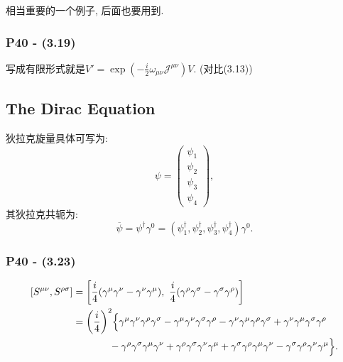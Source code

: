 \documentclass[cn,hazy,blue,11pt,device=normal,chinesefont=founder]{elegantnote}
\begin{document}
相当重要的一个例子, 后面也要用到. 

\subsubsection{P40 - (3.19)}

写成有限形式就是$V' = \exp{(-\frac{i}{2}\omega_{\mu\nu}\mathcal{J}^{\mu\nu})}V$. (对比(3.13))

\subsection{The Dirac Equation}

\begin{note}
  狄拉克旋量具体可写为:  
  \begin{equation}
    \psi = \left( \begin{array}{c} \psi_1 \\ \psi_2 \\ \psi_3 \\ \psi_4 \end{array} \right), 
  \end{equation}
  其狄拉克共轭为: 
  \begin{equation}
    \overline{\psi} = \psi^\dagger \gamma^0 = (\psi^\dagger_1, \psi^\dagger_2, \psi^\dagger_3, \psi^\dagger_4)\gamma^0. 
  \end{equation}
\end{note}

\subsubsection{P40 - (3.23)}

\begin{equation}
  \begin{aligned}
    \relax
    [S^{\mu\nu}, S^{\rho\sigma}] &= \biggl[\frac{i}{4}(\gamma^\mu \gamma^\nu - \gamma^\nu \gamma^\mu), \ \frac{i}{4}(\gamma^\rho \gamma^\sigma - \gamma^\sigma \gamma^\rho)\biggr]\\
    &= \biggl(\frac{i}{4}\biggr)^2 \Bigl\{\gamma^\mu \gamma^\nu \gamma^\rho \gamma^\sigma - \gamma^\mu \gamma^\nu \gamma^\sigma \gamma^\rho - \gamma^\nu \gamma^\mu \gamma^\rho \gamma^\sigma + \gamma^\nu \gamma^\mu \gamma^\sigma \gamma^\rho \\ 
    &\qquad \quad \ \ - \gamma^\rho \gamma^\sigma \gamma^\mu \gamma^\nu + \gamma^\rho \gamma^\sigma \gamma^\nu \gamma^\mu + \gamma^\sigma \gamma^\rho \gamma^\mu \gamma^\nu - \gamma^\sigma \gamma^\rho \gamma^\nu \gamma^\mu \Bigr\}. 
  \end{aligned}
\end{equation}
\end{document}
